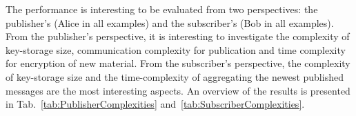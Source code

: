 The performance is interesting to be evaluated from two perspectives: the 
publisher's (Alice in all examples) and the subscriber's (Bob in all examples).
From the publisher's perspective, it is interesting to investigate the 
complexity of key-storage size, communication complexity for publication and 
time complexity for encryption of new material.
From the subscriber's perspective, the complexity of key-storage size and the 
time-complexity of aggregating the newest published messages are the most 
interesting aspects.
An overview of the results is presented in Tab.~\ref{tab:PublisherComplexities} 
and~\ref{tab:SubscriberComplexities}.

\begin{frame}
\begin{table}
  \centering
\end{table}
\end{frame}

